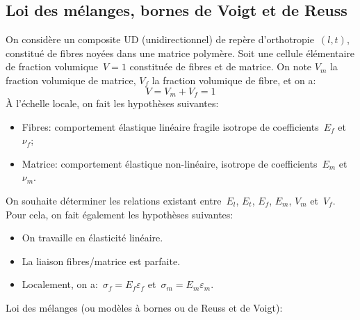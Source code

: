 \medskip
\subsection{Loi des mélanges, bornes de Voigt et de Reuss}

On considère un composite UD (unidirectionnel) de repère d'orthotropie~$(l,t)$, constitué de fibres noyées dans une matrice polymère. Soit une cellule élémentaire de fraction volumique~$V = 1$ constituée de fibres et de matrice. On note $V_m$ la fraction volumique de matrice, $V_f$ la fraction volumique de fibre, et on a:
\begin{equation} V = V_m + V_f =1 \end{equation}
\medskipvm
À l'échelle locale, on fait les hypothèses suivantes:
\begin{itemize}
  \item Fibres: comportement élastique linéaire fragile isotrope de coefficients~$E_f$ et~$\nu_f$;
  \item Matrice: comportement élastique non-linéaire, isotrope de coefficients~$E_m$ et~$\nu_m$.
\end{itemize}
\medskipvm
On souhaite déterminer les relations existant entre~$E_l$, $E_t$, $E_f$, $E_m$, $V_m$ et~$V_f$.
\medskipvm
Pour cela, on fait également les hypothèses suivantes:
\begin{itemize}
  \item On travaille en élasticité linéaire.
  \item La liaison fibres/matrice est parfaite.
  \item Localement, on a:~$\sigma_f = E_f \varepsilon_f$ et~$\sigma_m = E_m \varepsilon_m$.
\end{itemize}
\medskipvm
Loi des mélanges (ou modèles à bornes ou de Reuss et de Voigt):
